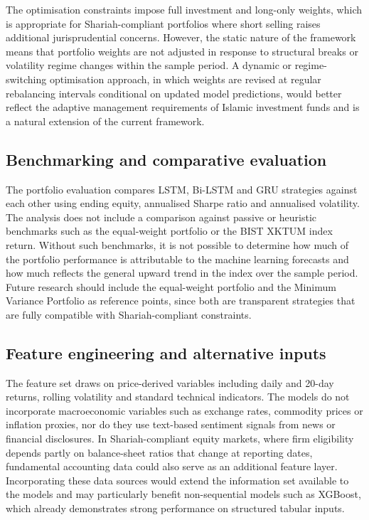 The optimisation constraints impose full investment and long-only weights, which
is appropriate for Shariah-compliant portfolios where short selling raises additional
jurisprudential concerns. However, the static nature of the framework means that
portfolio weights are not adjusted in response to structural breaks or volatility
regime changes within the sample period. A dynamic or regime-switching
optimisation approach, in which weights are revised at regular rebalancing
intervals conditional on updated model predictions, would better reflect the
adaptive management requirements of Islamic investment funds and is a natural
extension of the current framework.

\subsection{Benchmarking and comparative evaluation}

The portfolio evaluation compares LSTM, Bi-LSTM and GRU strategies against
each other using ending equity, annualised Sharpe ratio \citep{sharpe1966mutual}
and annualised volatility. The analysis does not include a comparison against
passive or heuristic benchmarks such as the equal-weight portfolio or the
BIST XKTUM index return. Without such benchmarks, it is not possible to
determine how much of the portfolio performance is attributable to the machine
learning forecasts and how much reflects the general upward trend in the index
over the sample period. Future research should include the equal-weight portfolio
\citep{taljaard2020equal, sen2023equal} and the Minimum Variance Portfolio as
reference points, since both are transparent strategies that are fully compatible
with Shariah-compliant constraints.

\subsection{Feature engineering and alternative inputs}

The feature set draws on price-derived variables including daily and 20-day returns,
rolling volatility and standard technical indicators. The models do not incorporate
macroeconomic variables such as exchange rates, commodity prices or inflation
proxies, nor do they use text-based sentiment signals from news or financial
disclosures. In Shariah-compliant equity markets, where firm eligibility depends
partly on balance-sheet ratios that change at reporting dates, fundamental accounting
data could also serve as an additional feature layer. Incorporating these data
sources would extend the information set available to the models and may
particularly benefit non-sequential models such as XGBoost, which already
demonstrates strong performance on structured tabular inputs.

